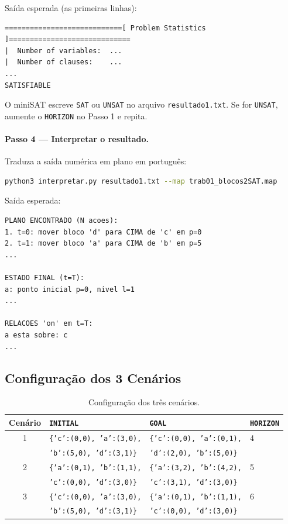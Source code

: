 \documentclass[12pt,a4paper]{article}
\begin{document}
Saída esperada (as primeiras linhas):

\begin{lstlisting}
============================[ Problem Statistics ]=============================
|  Number of variables:  ...
|  Number of clauses:    ...
...
SATISFIABLE
\end{lstlisting}

O miniSAT escreve \texttt{SAT} ou \texttt{UNSAT} no arquivo \texttt{resultado1.txt}. Se for \texttt{UNSAT}, aumente o \texttt{HORIZON} no Passo 1 e repita.

\paragraph{Passo 4 — Interpretar o resultado.}
Traduza a saída numérica em plano em português:

\begin{lstlisting}[language=bash]
python3 interpretar.py resultado1.txt --map trab01_blocos2SAT.map
\end{lstlisting}

Saída esperada:

\begin{lstlisting}
PLANO ENCONTRADO (N acoes):
1. t=0: mover bloco 'd' para CIMA de 'c' em p=0
2. t=1: mover bloco 'a' para CIMA de 'b' em p=5
...

ESTADO FINAL (t=T):
a: ponto inicial p=0, nivel l=1
...

RELACOES 'on' em t=T:
a esta sobre: c
...
\end{lstlisting}

\subsection{Configuração dos 3 Cenários}

\begin{table}[h!]
\centering
\small
\begin{tabular}{@{}clll@{}}
\toprule
\textbf{Cenário} & \texttt{INITIAL} & \texttt{GOAL} & \texttt{HORIZON} \\
\midrule
1 & \texttt{\{'c':(0,0), 'a':(3,0),} & \texttt{\{'c':(0,0), 'a':(0,1),} & 4 \\
  & \texttt{'b':(5,0), 'd':(3,1)\}} & \texttt{'d':(2,0), 'b':(5,0)\}} & \\
\midrule
2 & \texttt{\{'a':(0,1), 'b':(1,1),} & \texttt{\{'a':(3,2), 'b':(4,2),} & 5 \\
  & \texttt{'c':(0,0), 'd':(3,0)\}} & \texttt{'c':(3,1), 'd':(3,0)\}} & \\
\midrule
3 & \texttt{\{'c':(0,0), 'a':(3,0),} & \texttt{\{'a':(0,1), 'b':(1,1),} & 6 \\
  & \texttt{'b':(5,0), 'd':(3,1)\}} & \texttt{'c':(0,0), 'd':(3,0)\}} & \\
\bottomrule
\end{tabular}
\caption{Configuração dos três cenários.}
\end{table}
\end{document}
